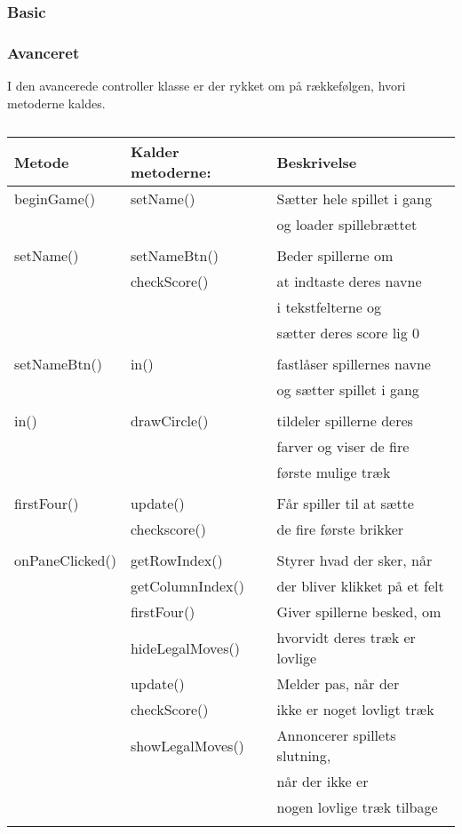 \subsubsection{Basic}



\subsubsection{Avanceret}
I den avancerede controller klasse er der rykket om på rækkefølgen, hvori metoderne kaldes.
\begin{table}[H]
\centering
\caption{}\label{tbl:}
\begin{tabular}{lll}
\toprule
Metode & Kalder metoderne: & Beskrivelse \\
\midrule
beginGame() & setName() & Sætter hele spillet i gang\\
&& og loader spillebrættet \\
& \\

setName() & setNameBtn() & Beder spillerne om \\ 
& checkScore() & at indtaste deres navne \\
&& i tekstfelterne og \\
&& sætter deres score lig 0\\
& \\

setNameBtn() & in() & fastlåser spillernes navne \\
&& og sætter spillet i gang\\
& \\

in() & drawCircle() & tildeler spillerne deres \\
&& farver og viser de fire \\
&& første mulige træk \\
& \\

firstFour() & update() & Får spiller til at sætte \\
& checkscore() & de fire første brikker\\
& \\

onPaneClicked() & getRowIndex() & Styrer hvad der sker, når \\ 
& getColumnIndex() & der bliver klikket på et felt\\
&  firstFour() & Giver spillerne besked, om \\
& hideLegalMoves() &hvorvidt deres træk er lovlige\\
& update() & Melder pas, når der \\ 
& checkScore() & ikke er noget lovligt træk\\
& showLegalMoves() & Annoncerer spillets slutning,\\ 
&& når der ikke er \\
&& nogen lovlige træk tilbage\\
& \\


\end{tabular}
\end{table}
